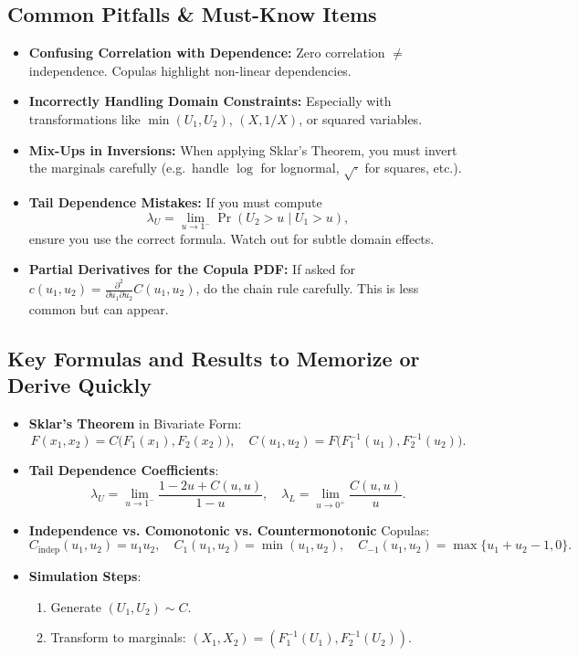 \documentclass[13pt,a4paper]{article}
\begin{document}
\subsection{Common Pitfalls \& Must-Know Items}
\begin{itemize}
  \item \textbf{Confusing Correlation with Dependence:}
    Zero correlation \(\neq\) independence. Copulas highlight non-linear dependencies.
  \item \textbf{Incorrectly Handling Domain Constraints:}
    Especially with transformations like \(\min(U_1,U_2)\), \((X,1/X)\), or squared variables.  
  \item \textbf{Mix-Ups in Inversions:}
    When applying Sklar’s Theorem, you must invert the marginals carefully (e.g.\ handle \(\log\) for lognormal, \(\sqrt{\cdot}\) for squares, etc.).
  \item \textbf{Tail Dependence Mistakes:}
    If you must compute 
    \[
      \lambda_U=\lim_{u\to 1^-}\Pr(U_2>u \mid U_1>u),
    \]
    ensure you use the correct formula. Watch out for subtle domain effects.
  \item \textbf{Partial Derivatives for the Copula PDF:}
    If asked for \(c(u_1,u_2)=\frac{\partial^2}{\partial u_1\partial u_2}C(u_1,u_2)\), do the chain rule carefully. This is less common but can appear.
\end{itemize}

\subsection{Key Formulas and Results to Memorize or Derive Quickly}
\begin{itemize}
  \item \textbf{Sklar's Theorem} in Bivariate Form: 
    \[
      F(x_1,x_2)=C\bigl(F_1(x_1),F_2(x_2)\bigr), 
      \quad C(u_1,u_2)=F\bigl(F_1^{-1}(u_1),F_2^{-1}(u_2)\bigr).
    \]
  \item \textbf{Tail Dependence Coefficients}: 
    \[
      \lambda_U = \lim_{u\to 1^-} \frac{1-2u + C(u,u)}{1-u}, 
      \quad
      \lambda_L = \lim_{u\to 0^+} \frac{C(u,u)}{u}.
    \]
  \item \textbf{Independence vs. Comonotonic vs. Countermonotonic} Copulas:
    \[
      C_{\text{indep}}(u_1,u_2)=u_1u_2, \quad
      C_{1}(u_1,u_2)=\min(u_1,u_2), \quad
      C_{-1}(u_1,u_2)=\max\{u_1+u_2-1,0\}.
    \]
  \item \textbf{Simulation Steps}:
    \begin{enumerate}
      \item Generate \((U_1,U_2)\sim C\).
      \item Transform to marginals: \((X_1,X_2)=(F_1^{-1}(U_1), F_2^{-1}(U_2))\).
    \end{enumerate}
\end{itemize}
\end{document}
